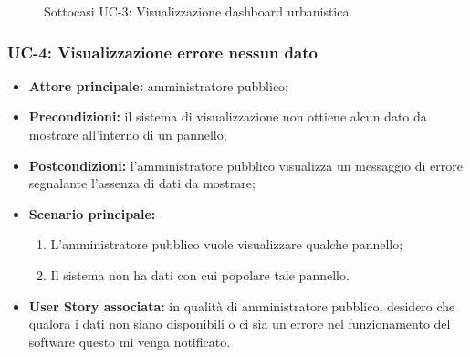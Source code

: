 \documentclass[8pt]{article}
\begin{document}
\begin{figure}[ht!]
    \centering
    \caption{Sottocasi UC-3: Visualizzazione dashboard urbanistica}
    \label{fig:Sottocasi UC-3: Visualizzazione dashboard urbanistica}
\end{figure}

\subsubsection*{UC-4: Visualizzazione errore nessun dato}
\begin{itemize}
    \item \textbf{Attore principale:} amministratore pubblico;
    \item \textbf{Precondizioni:} il sistema di visualizzazione non ottiene alcun dato da mostrare all’interno di un pannello;
    \item \textbf{Postcondizioni:} l’amministratore pubblico visualizza un messaggio di errore segnalante l’assenza di dati da mostrare;
    \item \textbf{Scenario principale:}
        \begin{enumerate}
        \item L’amministratore pubblico vuole visualizzare qualche pannello;
        \item Il sistema non ha dati con cui popolare tale pannello.
        \end{enumerate}
    \item \textbf{User Story associata:} in qualità di amministratore pubblico, desidero che qualora
        i dati non siano disponibili o ci sia un errore nel funzionamento del software questo mi
        venga notificato.
\end{itemize}
\end{document}
